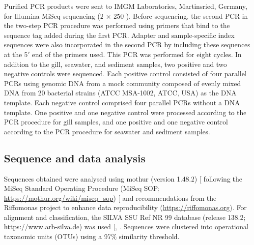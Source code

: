 \documentclass[
  12 pt,
]{article}
\begin{document}
Purified PCR products were sent to IMGM Laboratories, Martinsried, Germany, for Illumina MiSeq sequencing (2 × 250 \unit{\bp}). Before sequencing, the second PCR in the two-step PCR procedure was performed using primers that bind to the sequence tag added during the first PCR. Adapter and sample-specific index sequences were also incorporated in the second PCR by including these sequences at the 5\('\) end of the primers used. This PCR was performed for eight cycles. In addition to the gill, seawater, and sediment samples, two positive and two negative controls were sequenced. Each positive control consisted of four parallel PCRs using genomic DNA from a mock community composed of evenly mixed DNA from 20 bacterial strains (ATCC MSA-1002, ATCC, USA) as the DNA template. Each negative control comprised four parallel PCRs without a DNA template. One positive and one negative control were processed according to the PCR procedure for gill samples, and one positive and one negative control according to the PCR procedure for seawater and sediment samples.

\subsection{Sequence and data analysis}\label{sequence-and-data-analysis}

Sequences obtained were analysed using mothur (version 1.48.2) {[}\citeproc{ref-Schloss2009}{53}{]} following the MiSeq Standard Operating Procedure (MiSeq SOP; \url{https://mothur.org/wiki/miseq_sop}) {[}\citeproc{ref-Kozich2013}{54}{]} and recommendations from the Riffomonas project to enhance data reproducibility (\url{https://riffomonas.org}). For alignment and classification, the SILVA SSU Ref NR 99 database (release 138.2; \url{https://www.arb-silva.de}) was used {[}, \citeproc{ref-Yilmaz2014}{56}{]}. Sequences were clustered into operational taxonomic units (OTUs) using a 97\unit{\percent} similarity threshold.
\end{document}
